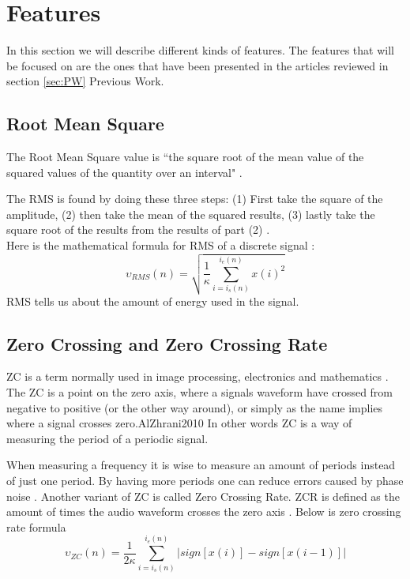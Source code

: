 \section{Features}
In this section we will describe different kinds of features. The features that will be focused on are the ones that have been presented in the articles reviewed in section \ref{sec:PW} Previous Work.

\subsection{Root Mean Square}
The Root Mean Square value is “the square root of the mean value of the squared values of the quantity over an interval"  \citep{RMS-kilde...}.


The RMS is found by doing these three steps:
(1) First take the square of the amplitude, (2) then take the mean of the squared results, (3) lastly take the square root of the results from the results of part (2) \citep{Bird2007}. \\ Here is the mathematical formula for RMS of a discrete signal \citep{ACA}:
\begin{equation}\label{eq:RMS formular}
\upsilon_{RMS}(n) = \sqrt{\frac{1}{\kappa}\sum_{i=i_s(n)}^{i_e(n)} x(i)^2}
\end{equation}
RMS tells us about the amount of energy used in the signal.

\subsection{Zero Crossing and Zero Crossing Rate}
ZC is a term normally used in image processing, electronics and mathematics \citep{AlZhrani2010}. The ZC is a point on the zero axis, where a signals waveform have crossed from negative to positive (or the other way around), or simply as the name implies where a signal crosses zero.{AlZhrani2010}
In other words ZC is a way of measuring the period of a periodic signal\citep{RWW2012}.


When measuring a frequency it is wise to measure an amount of periods instead of just one period. By having more periods one can reduce errors caused by phase noise \citep{RWW2012}.
Another variant of ZC is called Zero Crossing Rate. ZCR is defined as the amount of times the audio waveform crosses the zero axis \citep{DSShete}.
Below is zero crossing rate formula \citep{ACA} 
\begin{equation}\label{eq:ZCR}
\upsilon_{ZC}(n)= \frac{1}{2 \kappa}\sum_{i=i_s(n)}^{i_e (n)}|sign[x(i)]-sign[x(i-1)]|
\end{equation}

